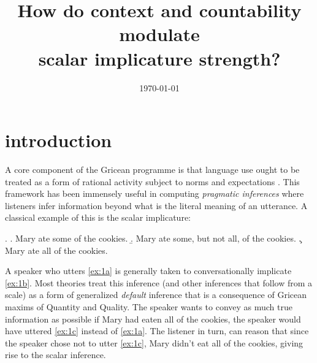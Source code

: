 \documentclass[10pt, biblatex]{report}
\title[philosophy of language]{How do context and countability modulate\\
                                    scalar implicature strength?}
\author[venkat]{
                \spauthor{venkata s govindarajan}
                }
\date{\today}
\begin{document}
\nocite{*}

\maketitle


%


\section{introduction}
\label{sec:introduction}

A core component of the Gricean programme is that language use ought to be
treated as a form of rational activity subject to norms and expectations
\citep{grice_logic_1975}. This
framework has been immensely useful in computing \textit{pragmatic inferences}
where listeners infer information beyond what is the literal meaning
of an utterance. A classical example of this is the scalar implicature:

\ex. \label{ex:1}\a. Mary ate some of the cookies.\label{ex:1a}
                 \b. Mary ate some, but not all, of the cookies.\label{ex:1b}
                 \c. Mary ate all of the cookies.\label{ex:1c}

A speaker who utters \ref{ex:1a} is generally taken to conversationally
implicate \ref{ex:1b}. Most theories treat this inference (and other inferences
that follow from a scale) as a form of generalized \textit{default} inference
that is a consequence of Gricean maxims of Quantity and Quality\citep{grice_logic_1975,
horn_towards_1984}. The speaker
wants to convey as much true information as possible \dash if Mary had eaten all
of the cookies, the speaker would have uttered \ref{ex:1c} instead of
\ref{ex:1a}. The listener in turn, can
reason that since the speaker chose not to utter \ref{ex:1c}, Mary didn't eat
all of the cookies, giving rise to the scalar inference.
\end{document}
